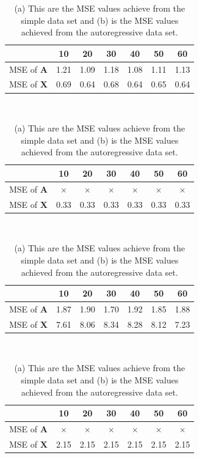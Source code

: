 \begin{table}[H]
\centering
\begin{minipage}{.5\linewidth}
\centering
\begin{tabular}{|c|c|c|c|c|c|c|}
\hline 
 & 10 & 20 & 30 & 40 & 50 & 60 \\ 
\hline 
MSE of $\mathbf{A}$ & 1.21 & 1.09 & 1.18 & 1.08 & 1.11 & 1.13 \\ 
\hline 
MSE of $\mathbf{X}$ & 0.69 & 0.64 & 0.68 & 0.64 & 0.65 & 0.64 \\ 
\hline 
\end{tabular} 
\end{minipage}
\\
\begin{minipage}{.5\linewidth}
\centering
\begin{tabular}{|c|c|c|c|c|c|c|}
\hline 
 & 10 & 20 & 30 & 40 & 50 & 60 \\ 
\hline 
MSE of $\mathbf{A}$ & $\times$ & $\times$ & $\times$ & $\times$ & $\times$ & $\times$ \\ 
\hline 
MSE of $\mathbf{X}$ & 0.33 & 0.33 & 0.33 & 0.33 & 0.33 & 0.33 \\ 
\hline 
\end{tabular} 
\end{minipage}
\\
\begin{minipage}{.5\linewidth}
\centering
\begin{tabular}{|c|c|c|c|c|c|c|}
\hline 
 & 10 & 20 & 30 & 40 & 50 & 60 \\ 
\hline
MSE of $\mathbf{A}$ & 1.87 & 1.90 & 1.70 & 1.92 & 1.85 & 1.88 \\
\hline 
MSE of $\mathbf{X}$ & 7.61 & 8.06 & 8.34 & 8.28 & 8.12 & 7.23 \\ 
\hline
\end{tabular} 
\end{minipage}
\\
\begin{minipage}{.5\linewidth}
\centering
\begin{tabular}{|c|c|c|c|c|c|c|}
\hline 
 & 10 & 20 & 30 & 40 & 50 & 60 \\ 
\hline 
MSE of $\mathbf{A}$ & $\times$ & $\times$ & $\times$ & $\times$ & $\times$ & $\times$ \\ 
\hline 
MSE of $\mathbf{X}$ & 2.15 & 2.15 & 2.15 & 2.15 & 2.15 & 2.15 \\  
\hline
\end{tabular} 
\end{minipage}
\caption{(a) This are the MSE values achieve from the simple data set and (b) is the MSE values achieved from the autoregressive data set.}
\label{tab:seg}
\end{table}
\noindent
